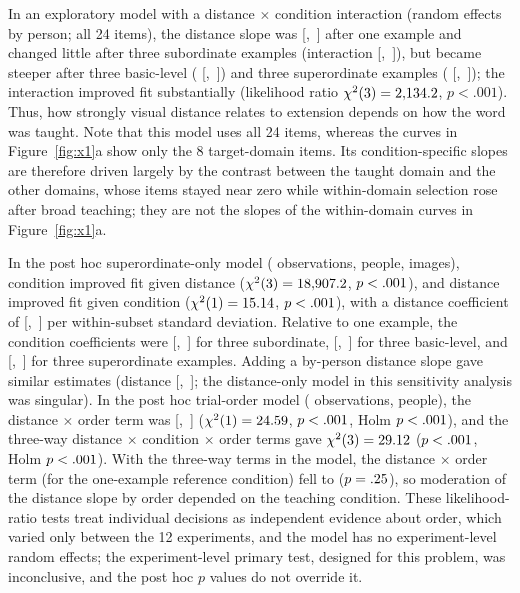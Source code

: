 \documentclass[11pt]{article}
\begin{document}
In an exploratory model with a distance $\times$ condition interaction (random effects by person; all 24 items), the distance slope was \IntRefB{} [\IntRefLo,~\IntRefHi] after one example and changed little after three subordinate examples (interaction \IntSubB{} [\IntSubLo,~\IntSubHi]), but became steeper after three basic-level (\IntBasB{} [\IntBasLo,~\IntBasHi]) and three superordinate examples (\IntSupB{} [\IntSupLo,~\IntSupHi]); the interaction improved fit substantially (likelihood ratio $\chi^2(3) = 2{,}134.2$, $p < .001$). Thus, how strongly visual distance relates to extension depends on how the word was taught. Note that this model uses all 24 items, whereas the curves in Figure~\ref{fig:x1}a show only the 8 target-domain items. Its condition-specific slopes are therefore driven largely by the contrast between the taught domain and the other domains, whose items stayed near zero while within-domain selection rose after broad teaching; they are not the slopes of the within-domain curves in Figure~\ref{fig:x1}a.

In the post hoc superordinate-only model (\SupNobs{} observations, \SupPersons{} people, \SupImages{} images), condition improved fit given distance ($\chi^2(3) = 18{,}907.2$, $p < .001$), and distance improved fit given condition ($\chi^2(1) = 15.14$, $p < .001$), with a distance coefficient of \SupZdB{} [\SupZdLo,~\SupZdHi] per within-subset standard deviation. Relative to one example, the condition coefficients were \SupCSubB{} [\SupCSubLo,~\SupCSubHi] for three subordinate, \SupCBasB{} [\SupCBasLo,~\SupCBasHi] for three basic-level, and \SupCSupB{} [\SupCSupLo,~\SupCSupHi] for three superordinate examples. Adding a by-person distance slope gave similar estimates (distance \SupSlZdB{} [\SupSlZdLo,~\SupSlZdHi]; the distance-only model in this sensitivity analysis was singular). In the post hoc trial-order model (\OrdNobs{} observations, \OrdPersons{} people), the distance $\times$ order term was \OrdZdB{} [\OrdZdLo,~\OrdZdHi] ($\chi^2(1) = 24.59$, $p < .001$, Holm $p < .001$), and the three-way distance $\times$ condition $\times$ order terms gave $\chi^2(3) = 29.12$ ($p < .001$, Holm $p < .001$). With the three-way terms in the model, the distance $\times$ order term (for the one-example reference condition) fell to \OrdZdTriB{} ($p = .25$), so moderation of the distance slope by order depended on the teaching condition. These likelihood-ratio tests treat individual decisions as independent evidence about order, which varied only between the 12 experiments, and the model has no experiment-level random effects; the experiment-level primary test, designed for this problem, was inconclusive, and the post hoc $p$ values do not override it.
\end{document}
